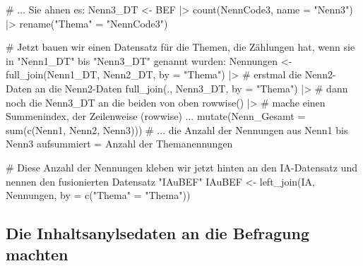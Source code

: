 \documentclass[twoside, pagesize, fontsize=11pt, dvipsnames]{scrreport}
\newenvironment{Shaded}{\begin{snugshade}}{\end{snugshade}}
\newcommand{\AttributeTok}[1]{\textcolor[rgb]{0.40,0.45,0.13}{#1}}
\newcommand{\CommentTok}[1]{\textcolor[rgb]{0.37,0.37,0.37}{#1}}
\newcommand{\FunctionTok}[1]{\textcolor[rgb]{0.28,0.35,0.67}{#1}}
\newcommand{\NormalTok}[1]{\textcolor[rgb]{0.00,0.23,0.31}{#1}}
\newcommand{\OtherTok}[1]{\textcolor[rgb]{0.00,0.23,0.31}{#1}}
\newcommand{\SpecialCharTok}[1]{\textcolor[rgb]{0.37,0.37,0.37}{#1}}
\newcommand{\StringTok}[1]{\textcolor[rgb]{0.13,0.47,0.30}{#1}}
\begin{document}
\begin{Shaded}
\begin{Highlighting}[]
\CommentTok{\# ... Sie ahnen es:}
\NormalTok{Nenn3\_DT }\OtherTok{\textless{}{-}}\NormalTok{ BEF }\SpecialCharTok{|\textgreater{}} 
  \FunctionTok{count}\NormalTok{(NennCode3, }\AttributeTok{name =} \StringTok{"Nenn3"}\NormalTok{) }\SpecialCharTok{|\textgreater{}} 
  \FunctionTok{rename}\NormalTok{(}\StringTok{"Thema"} \OtherTok{=} \StringTok{"NennCode3"}\NormalTok{)}

\CommentTok{\# Jetzt bauen wir einen Datensatz für die Themen, die Zählungen hat, wenn sie in "Nenn1\_DT" bis "Nenn3\_DT" genannt wurden:}
\NormalTok{Nennungen }\OtherTok{\textless{}{-}} \FunctionTok{full\_join}\NormalTok{(Nenn1\_DT, Nenn2\_DT, }\AttributeTok{by =} \StringTok{"Thema"}\NormalTok{) }\SpecialCharTok{|\textgreater{}} \CommentTok{\# erstmal die Nenn2{-}Daten an die Nenn2{-}Daten}
  \FunctionTok{full\_join}\NormalTok{(., Nenn3\_DT, }\AttributeTok{by =} \StringTok{"Thema"}\NormalTok{) }\SpecialCharTok{|\textgreater{}} \CommentTok{\# dann noch die Nenn3\_DT an die beiden von oben}
  \FunctionTok{rowwise}\NormalTok{() }\SpecialCharTok{|\textgreater{}} \CommentTok{\# mache einen Summenindex, der Zeilenweise (rowwise) ...}
  \FunctionTok{mutate}\NormalTok{(}\AttributeTok{Nenn\_Gesamt =} \FunctionTok{sum}\NormalTok{(}\FunctionTok{c}\NormalTok{(Nenn1, Nenn2, Nenn3))) }\CommentTok{\# ... die Anzahl der Nennungen aus Nenn1 bis Nenn3 aufsummiert = Anzahl der Themanennungen}

\CommentTok{\# Diese Anzahl der Nennungen kleben wir jetzt hinten an den IA{-}Datensatz und nennen den fusionierten Datensatz "IAuBEF"}
\NormalTok{IAuBEF }\OtherTok{\textless{}{-}} \FunctionTok{left\_join}\NormalTok{(IA, Nennungen, }\AttributeTok{by =} \FunctionTok{c}\NormalTok{(}\StringTok{"Thema"} \OtherTok{=} \StringTok{"Thema"}\NormalTok{))}
\end{Highlighting}
\end{Shaded}

\hypertarget{IAanBefragung}{%
\subsection{Die Inhaltsanylsedaten an die Befragung
machten}\label{IAanBefragung}}
\end{document}
